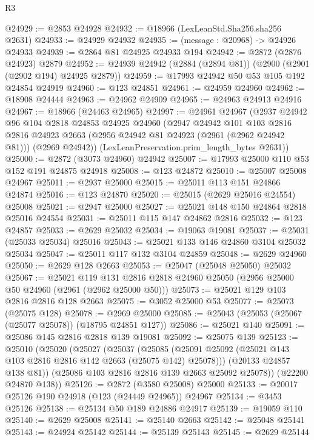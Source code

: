 \begin{lexlean}{R3}
\begin{coremodule}
@24929 := @2853 @24928
@24932 := @18966 (LexLeanStd.Sha256.sha256 @2631)
@24933 := @24929 @24932
@24935 := (message : @20968) -> @24926 @24933
@24939 := @2864 @81 @24925 @24933 @194
@24942 := @2872 (@2876 @24923) @2879
@24952 := @24939 @24942 (@2884 (@2894 @81)) (@2900 (@2901 (@2902 @194) @24925 @2879))
@24959 := @17993 @24942 @50 @53 @105 @192 @24854 @24919
@24960 := @123 @24851
@24961 := @24959 @24960
@24962 := @18908 @24444
@24963 := @24962 @24909
@24965 := @24963 @24913 @24916
@24967 := @18966 (@24463 @24965)
@24997 := @24961
    @24967
    (@2937
      @24942
      @96
      @104
      @2818
      @24853
      @24925
      @24960
      (@2947
        @24942
        @101
        @103
        @2816
        @2816
        @24923
        @2663
        (@2956 @24942 @81 @24923 (@2961 (@2962 @24942 @81)))
        (@2969 @24942))
      (LexLeanPreservation.prim_length_bytes @2631))
@25000 := @2872 (@3073 @24960) @24942
@25007 := @17993 @25000 @110 @53 @152 @191 @24875 @24918
@25008 := @123 @24872
@25010 := @25007 @25008 @24967
@25011 := @2937 @25000
@25015 := @25011 @113 @151 @24866 @24874
@25016 := @123 @24870
@25020 := @25015 (@2629 @25016 @24554) @25008
@25021 := @2947 @25000
@25027 := @25021 @148 @150 @24864 @2818 @25016 @24554
@25031 := @25011 @115 @147 @24862 @2816
@25032 := @123 @24857
@25033 := @2629 @25032
@25034 := @19063 @19081
@25037 := @25031 (@25033 @25034) @25016
@25043 := @25021 @133 @146 @24860 @3104 @25032 @25034
@25047 := @25011 @117 @132 @3104 @24859
@25048 := @2629 @24960
@25050 := @2629 @128 @2663
@25053 := @25047 (@25048 @25050) @25032
@25067 := @25021
    @119
    @131
    @2816
    @2818
    @24960
    @25050
    (@2956 @25000 @50 @24960 (@2961 (@2962 @25000 @50)))
@25073 := @25021 @129 @103 @2816 @2816 @128 @2663
@25075 := @3052 @25000 @53
@25077 := @25073 (@25075 @128)
@25078 := @2969 @25000
@25085 := @25043 (@25053 (@25067 (@25077 @25078)) (@18795 @24851 @127))
@25086 := @25021 @140
@25091 := @25086 @145 @2816 @2818 @139 @19081
@25092 := @25075 @139
@25123 := @25010
    (@25020
      (@25027
        (@25037
          (@25085 (@25091 @25092 (@25021 @143 @103 @2816 @2816 @142 @2663 (@25075 @142) @25078)))
          (@20133 @24857 @138 @81))
        (@25086 @103 @2816 @2816 @139 @2663 @25092 @25078))
      (@22200 @24870 @138))
@25126 := @2872 (@3580 @25008) @25000
@25133 := @20017 @25126 @190 @24918 (@123 (@24449 @24965)) @24967
@25134 := @3453 @25126
@25138 := @25134 @50 @189 @24886 @24917
@25139 := @19059 @110
@25140 := @2629 @25008
@25141 := @25140 @2663
@25142 := @25048 @25141
@25143 := @24924 @25142
@25144 := @25139 @25143
@25145 := @2629 @25144

\end{coremodule}
\end{lexlean}
